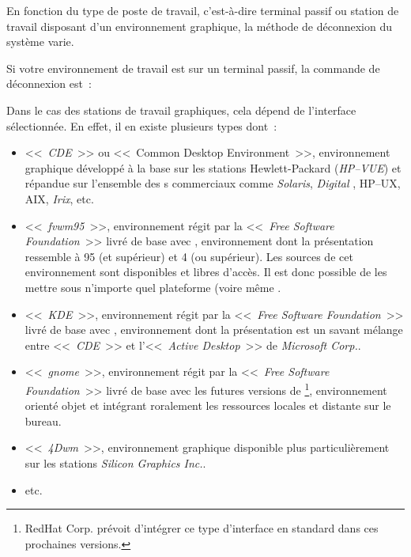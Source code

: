 En fonction du type de poste de travail, c'est-{\`a}-dire terminal passif ou
station de travail disposant d'un environnement graphique, la m{\'e}thode de
d{\'e}con\-nexion du syst{\`e}me varie.

Si votre environnement de travail est sur un terminal passif, la commande
de d{\'e}connexion est~:
\begin{quote}
\end{quote}

Dans le cas des stations de travail graphiques, cela d{\'e}pend de l'interface
s{\'e}lectionn{\'e}e. En effet, il en existe plusieurs types dont~:
\begin{itemize}
	\item	<<~{\sl CDE}~>> ou <<~Common Desktop Environment~>>, environnement
			graphique d{\'e}velopp{\'e} {\`a} la base sur les stations Hewlett-Packard
			({\sl HP--VUE}) et r{\'e}pandue sur l'ensemble des {\Unix}s commerciaux
			comme {\sl Solaris}, {\sl Digital {\Unix}}, {\sf HP--UX},
			{\sf AIX}, {\sl Irix}, etc.
	\item	<<~{\sl fvwm95}~>>, environnement r{\'e}git par la <<~{\sl Free Software
			Foundation}~>> livr{\'e} de base avec {\Linux}, environnement
			dont la pr{\'e}sentation ressemble {\`a} {\Windows}95 (et sup{\'e}rieur)
			et {\WindowsNT} 4 (ou sup{\'e}rieur). Les sources de cet environnement
			sont disponibles et libres d'acc{\`e}s. Il est donc possible
			de les mettre sous n'importe quel plateforme {\Unix} (voire
			m{\^e}me {\OpenVMS}.
	\item	<<~{\sl KDE}~>>, environnement r{\'e}git par la <<~{\sl Free Software
			Foundation}~>> livr{\'e} de base avec {\Linux}, environnement
			dont la pr{\'e}sentation est un savant m{\'e}lange entre <<~{\sl CDE}~>>
			et l'<<~{\sl Active Desktop}~>> de {\sl Microsoft Corp.}.
	\item	<<~{\sl gnome}~>>, environnement r{\'e}git par la <<~{\sl Free Software
			Foundation}~>> livr{\'e} de base avec les futures versions de
			{\Linux}\footnote{RedHat Corp. pr{\'e}voit d'int{\'e}grer ce type
			d'interface en standard dans ces prochaines versions.},
			environnement orient{\'e} objet et int{\'e}grant roralement les ressources
			locales et distante sur le bureau.
	\item	<<~{\sl 4Dwm}~>>, environnement graphique disponible plus
			particuli{\`e}rement sur les stations {\sl Silicon Graphics Inc.}.
	\item	etc.
\end{itemize}

